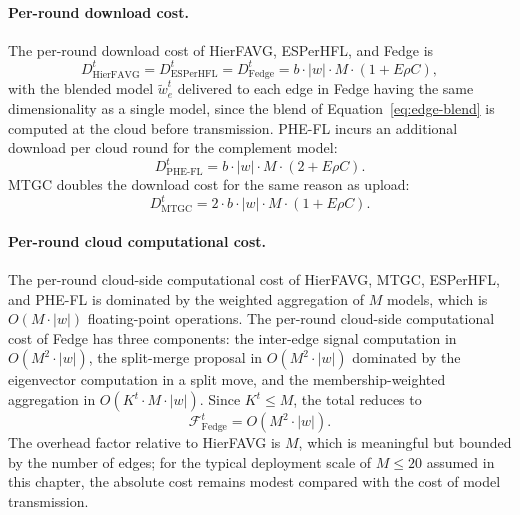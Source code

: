 \paragraph{Per-round download cost.}
The per-round download cost of HierFAVG, ESPerHFL, and Fedge is
\begin{equation}
\label{eq:cost-hierfavg-down}
D_{\text{HierFAVG}}^{t} = D_{\text{ESPerHFL}}^{t} = D_{\text{Fedge}}^{t} = b \cdot |w| \cdot M \cdot \left( 1 + E \rho C \right),
\end{equation}
with the blended model $\tilde{w}_e^t$ delivered to each edge in Fedge having the same dimensionality as a single model, since the blend of Equation~\eqref{eq:edge-blend} is computed at the cloud before transmission. PHE-FL incurs an additional download per cloud round for the complement model:
\begin{equation}
\label{eq:cost-phefl-down}
D_{\text{PHE-FL}}^{t} = b \cdot |w| \cdot M \cdot \left( 2 + E \rho C \right).
\end{equation}
MTGC doubles the download cost for the same reason as upload:
\begin{equation}
\label{eq:cost-mtgc-down}
D_{\text{MTGC}}^{t} = 2 \cdot b \cdot |w| \cdot M \cdot \left( 1 + E \rho C \right).
\end{equation}

\paragraph{Per-round cloud computational cost.}
The per-round cloud-side computational cost of HierFAVG, MTGC, ESPerHFL, and PHE-FL is dominated by the weighted aggregation of $M$ models, which is $O(M \cdot |w|)$ floating-point operations. The per-round cloud-side computational cost of Fedge has three components: the inter-edge signal computation in $O(M^{2} \cdot |w|)$, the split-merge proposal in $O(M^{2} \cdot |w|)$ dominated by the eigenvector computation in a split move, and the membership-weighted aggregation in $O(K^{t} \cdot M \cdot |w|)$. Since $K^{t} \leq M$, the total reduces to
\begin{equation}
\label{eq:cost-fedge-compute}
\mathcal{F}_{\text{Fedge}}^{t} = O\!\left( M^{2} \cdot |w| \right).
\end{equation}
The overhead factor relative to HierFAVG is $M$, which is meaningful but bounded by the number of edges; for the typical deployment scale of $M \leq 20$ assumed in this chapter, the absolute cost remains modest compared with the cost of model transmission.

